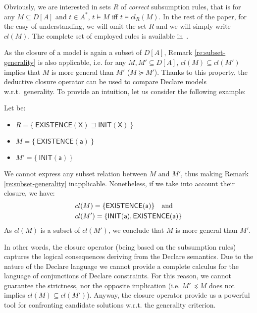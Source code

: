 \noindent Obviously, we are interested in sets $R$ of \emph{correct} subsumption rules, that is for any $M\subseteq D[A]$ and $t\in A^*$, $t\models M$ iff $t\models cl_R(M)$. In the rest of the paper, for the easy of understanding, we will omit the set $R$ and we will simply write $cl(M)$. The complete set of employed rules is available in~\cite{negdis:2021_5158528}.


As the closure of a model is again a subset of $D[A]$, Remark \ref{re:subset-generality} is also applicable, i.e. for any $M, M'\subseteq D[A]$, $cl(M)\subseteq cl(M')$ implies that $M$ is more general than $M'$ ($M\succeq M'$).
%
%
Thanks to this property, the deductive closure operator can be used to compare Declare models w.r.t.~generality. To provide an intuition, let us consider the following example:

\begin{example}
Let be:
\begin{itemize}
\item $R=\{\ \mathsf{EXISTENCE(X)} \sqsupseteq \mathsf{INIT(X)}\ \}$
\item $M = \{\ \mathsf{EXISTENCE(a)}\ \}$
\item $M' = \{\ \mathsf{INIT(a)}\ \}$
\end{itemize}
We cannot express any subset relation between $M$ and $M'$, thus making Remark \ref{re:subset-generality} inapplicable.
Nonetheless, if we take into account their closure, we have:
\begin{align*}
	& cl(M)=\{\mathsf{EXISTENCE(a)}\}\quad \textnormal{and} \\
	& cl(M')=\{\mathsf{INIT(a)}, \mathsf{EXISTENCE(a)}\}
\end{align*}
As $cl(M)$ is a subset of $cl(M')$, we conclude that $M$ is more general than $M'$.
\end{example}
%
\noindent In other words, the closure operator (being based on the subsumption rules) captures the logical consequences deriving from the Declare semantics.
Due to the nature of the Declare language we cannot provide a complete calculus for the language of conjunctions of Declare constraints. For this reason, we cannot guarantee the strictness, nor the opposite implication (i.e. $M'\preceq M$ does not implies $cl(M)\subseteq cl(M')$). Anyway, the closure operator provide us a powerful tool for confronting candidate solutions w.r.t. the generality criterion.


